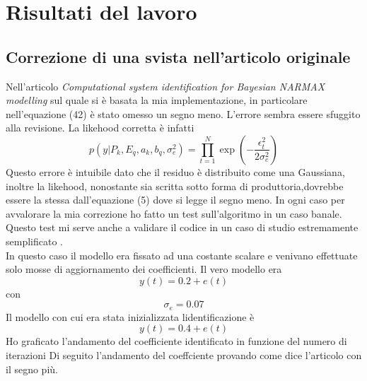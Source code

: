 \chapter{Risultati del lavoro}
\section*{Correzione di una svista nell'articolo originale}
Nell'articolo \emph{Computational system identification for Bayesian
NARMAX modelling} sul quale si è basata la mia implementazione, in particolare nell'equazione (42) è stato omesso un segno meno.
L'errore sembra essere sfuggito alla revisione.
La likehood corretta è infatti
\[p(y|P_k,E_q,a_k,b_q,\sigma_e^2)=\prod_{t=1}^N \exp \left(-\frac{\epsilon_t^2}{2\sigma_e^2}\right)\]
Questo errore è intuibile dato che il residuo è distribuito come una Gaussiana,
inoltre la likehood, nonostante sia scritta sotto forma di produttoria,dovrebbe essere la stessa dall'equazione (5) dove si legge il segno meno. In ogni caso per avvalorare la mia correzione ho  fatto un test sull'algoritmo in un caso banale. Questo test mi serve anche a validare il codice in un caso di studio estremamente semplificato .
\\
In questo caso il modello era fissato ad una costante scalare e venivano effettuate solo mosse di aggiornamento dei coefficienti.
Il vero modello era
\[y(t)=0.2+e(t)\]
con
\[\sigma_e= 0.07\]
Il modello con cui era stata inizializzata lidentificazione è
\[y(t)=0.4+e(t)\]
Ho graficato l'andamento del coefficiente identificato in funzione del numero di iterazioni
Di seguito l'andamento del coeffciente provando come dice l'articolo con il segno più.\\
